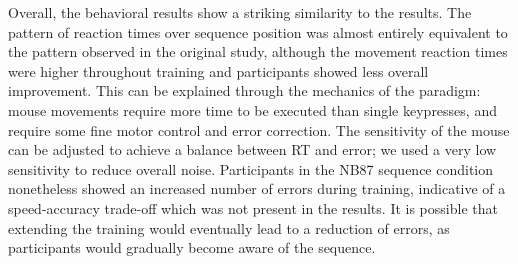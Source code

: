 \documentclass[man,floatsintext]{apa6}
\begin{document}
Overall, the behavioral results show a striking similarity to the  results. The pattern of reaction times over sequence position was almost entirely equivalent to the pattern observed in the original study, although the movement reaction times were higher throughout training and participants showed less overall improvement. This can be explained through the mechanics of the paradigm: mouse movements require more time to be executed than single keypresses, and require some fine motor control and error correction. The sensitivity of the mouse can be adjusted to achieve a balance between RT and error; we used a very low sensitivity to reduce overall noise. Participants in the NB87 sequence condition nonetheless showed an increased number of errors during training, indicative of a speed-accuracy trade-off which was not present in the  results. It is possible that extending the training would eventually lead to a reduction of errors, as participants would gradually become aware of the sequence. 






\end{document}
